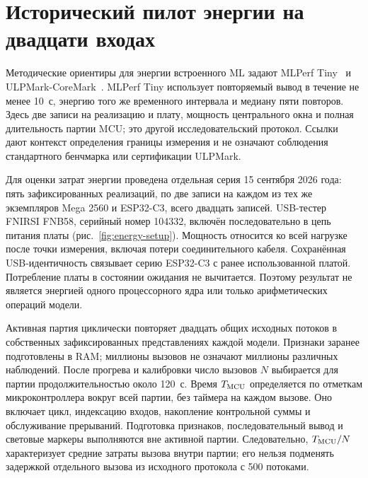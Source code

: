\section{Исторический пилот энергии на двадцати входах}
\label{sec:energy-pilot}
Методические ориентиры для энергии встроенного ML задают MLPerf Tiny~\cite{Banbury2021MLPerfTiny} и ULPMark-CoreMark~\cite{EEMBCULPMarkCM}. MLPerf Tiny использует повторяемый вывод в течение не менее 10~с, энергию того же временного интервала и медиану пяти повторов. Здесь две записи на реализацию и плату, мощность центрального окна и полная длительность партии MCU; это другой исследовательский протокол. Ссылки дают контекст определения границы измерения и не означают соблюдения стандартного бенчмарка или сертификации ULPMark.

Для оценки затрат энергии проведена отдельная серия 15 сентября 2026 года: пять зафиксированных реализаций, по две записи на каждом из тех же экземпляров Mega 2560 и ESP32-C3, всего двадцать записей. USB-тестер FNIRSI FNB58, серийный номер 104332, включён последовательно в цепь питания платы (рис.~\ref{fig:energy-setup}). Мощность относится ко всей нагрузке после точки измерения, включая потери соединительного кабеля. Сохранённая USB-идентичность связывает серию ESP32-C3 с ранее использованной платой. Потребление платы в состоянии ожидания не вычитается. Поэтому результат не является энергией одного процессорного ядра или только арифметических операций модели.



Активная партия циклически повторяет двадцать общих исходных потоков в собственных зафиксированных представлениях каждой модели. Признаки заранее подготовлены в RAM; миллионы вызовов не означают миллионы различных наблюдений. После прогрева и калибровки число вызовов $N$ выбирается для партии продолжительностью около 120~с. Время $T_{\rm MCU}$ определяется по отметкам микроконтроллера вокруг всей партии, без таймера на каждом вызове. Оно включает цикл, индексацию входов, накопление контрольной суммы и обслуживание прерываний. Подготовка признаков, последовательный вывод и световые маркеры выполняются вне активной партии. Следовательно, $T_{\rm MCU}/N$ характеризует средние затраты вызова внутри партии; его нельзя подменять задержкой отдельного вызова из исходного протокола с 500 потоками.

